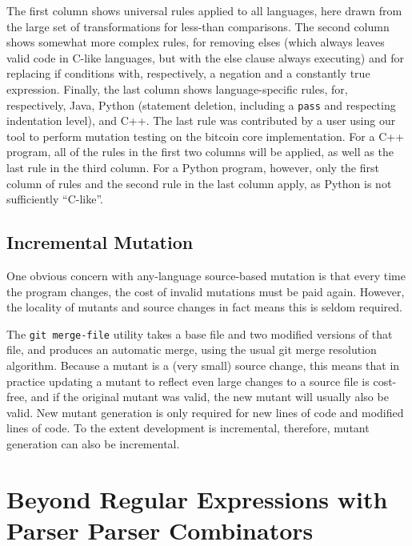 \documentclass[sigconf,review, anonymous]{acmart}
\begin{document}
{The first column shows universal rules applied to
all languages, here drawn from the large set of transformations for
less-than comparisons.  The second column shows somewhat more
complex rules, for removing elses (which always leaves valid code in
C-like languages, but with the else clause always executing) and for
replacing if conditions with, respectively, a negation and a
constantly true expression.  Finally, the last column shows
language-specific rules, for, respectively, Java, Python (statement
deletion, including a {\tt pass} and respecting indentation level),
and C++.  The last rule was contributed by a user using our tool to
perform mutation testing on the bitcoin core implementation.  For a
C++ program, all of the rules in the first two columns will be
applied, as well as the last rule in the third column.  For a Python
program, however, only the first column of rules and the second rule
in the last column apply, as Python is not sufficiently ``C-like''.


\subsection{Incremental Mutation}

One obvious concern with any-language source-based mutation is that every time the
program changes, the cost of invalid mutations must be paid again.
However, the locality of mutants and source changes in fact means this
is seldom required.

The {\tt git merge-file} utility takes a base file and two modified
versions of that file, and produces an automatic merge, using the
usual git merge resolution algorithm.    Because a mutant is a (very
small) source change, this means that in practice updating a mutant to
reflect even large changes to a source file is cost-free, and if the
original mutant was valid, the new mutant will usually also be valid.
New mutant generation is only required for new lines of code and
modified lines of code.  To the extent development is incremental,
therefore, mutant generation can also be incremental.

\section{Beyond Regular Expressions with Parser Parser Combinators}

}
\end{document}
